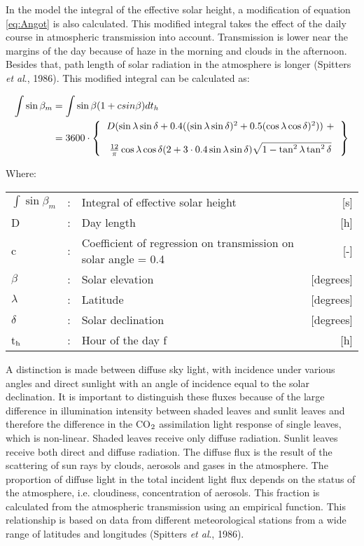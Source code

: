 In the model the integral of the effective solar height, a modification of equation \ref{eq:Angot} is
also calculated. This modified integral takes the effect of the daily course in atmospheric
transmis\-sion into account. Transmission is lower near the margins of the day because of
haze in the morning and clouds in the afternoon. Besides that, path length of solar
radiation in the atmosphere is longer (Spitters {\it et al}., 1986). This modified integral 
can be calculated as:

\begin{align}
\label{eq:IntSolarHeight}
\int \sin \beta_{m} &= \int \sin \beta (1+csin \beta ) dt_{h}  \\
&= 3600 \cdot \left \{
\begin{tabular}{c}
$D ( \sin \lambda \sin \delta + 0.4 
(( \sin \lambda \sin \delta )^{2} + 0.5( 
\cos \lambda \cos \delta ) ^{2} )) ~ + \nonumber$ \\[1em]
${\frac{12}{\pi}} \cos \lambda \cos 
\delta (2+3 \cdot 0.4 \sin \lambda \sin \delta ) 
\sqrt{1-\tan^{2} \lambda \tan^{2} \delta } \nonumber$
\end{tabular}
\right \}
\end{align}

Where:\\[5pt]
\begin{tabularx}{\textwidth}{llXr}
	$\int \sin \beta_{m}$  &:& Integral of effective solar height   & [s]\\
	D  &:& Day length       & [h]\\
	c  &:& Coefficient of regression on transmission on solar angle = 0.4  & [-]\\
	$\beta$  &:& Solar elevation   & [degrees]\\
	$\lambda$  &:& Latitude   & [degrees]\\
	$\delta$  &:& Solar declination   & [degrees]\\
	t$_{{\rm h}}$  &:& Hour of the day  f & [h]\\
\end{tabularx}

A distinction is made between diffuse sky light, with incidence under various angles and
direct sunlight with an angle of incidence equal to the solar declination. It is important 
to distin\-guish these fluxes because of the large difference in illumination intensity 
between shaded leaves and sunlit leaves and therefore the difference in the CO$_{{\rm 2}}$ 
assimila\-tion light response of single leaves, which is non-linear. Shaded leaves receive 
only diffuse radiation. Sunlit leaves receive both direct and diffuse radiation. The 
diffuse flux is the result of the scattering of sun rays by clouds, aerosols and gases in 
the atmo\-sphere. The propor\-tion of diffuse light in the total incident light flux depends 
on the status of the atmosphere, i.e. cloudi\-ness, concentra\-tion of aerosols. This 
fraction is calculated from the atmospheric transmis\-sion using an empirical function. 
This relationship is based on data from different meteorologi\-cal stations from a wide 
range of latitudes and longitudes (Spitters {\it et al}., 1986). 

